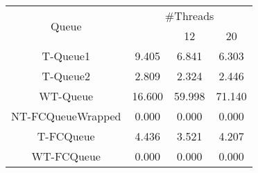 \begin{tabular}{|c|c|c|c|}
\hline
\multirow{2}{*}{Queue} & \multicolumn{3}{c|}{\#Threads}\\\cline{2-4}& \quad 4 & 12 & 20\\
\hline
\hline
T-Queue1 & 9.405 & 6.841 & 6.303\\
T-Queue2 & 2.809 & 2.324 & 2.446\\
WT-Queue & 16.600 & 59.998 & 71.140\\
NT-FCQueueWrapped & 0.000 & 0.000 & 0.000\\
T-FCQueue & 4.436 & 3.521 & 4.207\\
WT-FCQueue & 0.000 & 0.000 & 0.000\\
\hline\end{tabular}
